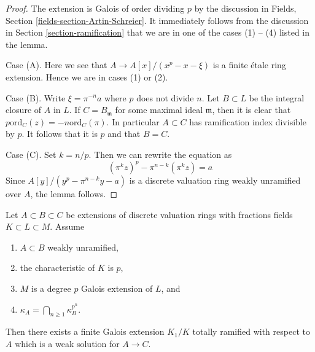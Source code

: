 \begin{proof}
The extension is Galois of order dividing $p$ by the discussion in
Fields, Section \ref{fields-section-Artin-Schreier}.
It immediately follows from the discussion in
Section \ref{section-ramification} that we are in one of the cases (1) -- (4)
listed in the lemma.

\medskip\noindent
Case (A). Here we see that $A \to A[x]/(x^p - x - \xi)$ is a finite
\'etale ring extension. Hence we are in cases (1) or (2).

\medskip\noindent
Case (B). Write $\xi = \pi^{-n}a$ where $p$ does not divide $n$.
Let $B \subset L$ be the integral closure of $A$ in $L$.
If $C = B_\mathfrak m$ for some maximal ideal $\mathfrak m$,
then it is clear that $p \text{ord}_C(z) = -n \text{ord}_C(\pi)$.
In particular $A \subset C$ has ramification index divisible by $p$.
It follows that it is $p$ and that $B = C$.

\medskip\noindent
Case (C). Set $k = n/p$. Then we can rewrite the equation as
$$
(\pi^kz)^p - \pi^{n - k} (\pi^kz) = a
$$
Since $A[y]/(y^p - \pi^{n - k}y - a)$ is a discrete valuation ring
weakly unramified over $A$, the lemma follows.
\end{proof}

\begin{lemma}
\label{lemma-characteristic-p-case}
Let $A \subset B \subset C$ be extensions of discrete valuation rings
with fractions fields $K \subset L \subset M$. Assume
\begin{enumerate}
\item $A \subset B$ weakly unramified,
\item the characteristic of $K$ is $p$,
\item $M$ is a degree $p$ Galois extension of $L$, and
\item $\kappa_A = \bigcap_{n \geq 1} \kappa_B^{p^n}$.
\end{enumerate}
Then there exists a finite Galois extension $K_1/K$
totally ramified with respect to $A$
which is a weak solution for $A \to C$.
\end{lemma}

